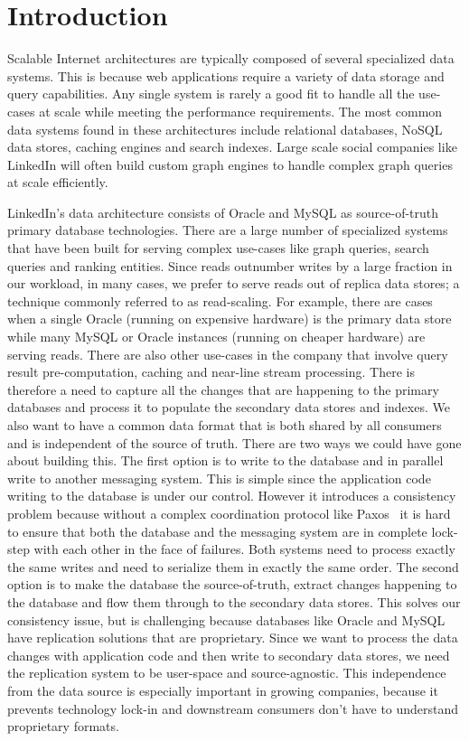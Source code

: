 \section{Introduction}

Scalable Internet architectures are typically composed of several specialized data systems. This is because web applications require a variety of data storage and query capabilities. Any single system is rarely a good fit to handle all the use-cases at scale while meeting the performance requirements. The most common data systems found in these architectures include relational databases, NoSQL data stores, caching engines and search indexes. Large scale social companies like LinkedIn will often build custom graph engines to handle complex graph queries at scale efficiently.

LinkedIn's data architecture consists of Oracle and MySQL as source-of-truth primary database technologies. There are a large number of specialized systems that have been built for serving complex use-cases like graph queries, search queries and ranking entities. Since reads outnumber writes by a large fraction in our workload, in many cases, we prefer to serve reads out of replica data stores; a technique commonly referred to as read-scaling. For example, there are cases when a single Oracle (running on expensive hardware) is the primary data store while many MySQL or Oracle instances (running on cheaper hardware) are serving reads. 
There are also other use-cases in the company that involve query result pre-computation, caching and near-line stream processing. 
There is therefore a need to capture all the changes that are happening to the primary databases and process it to populate the secondary data stores and indexes.
We also want to have a common data format that is both shared by all consumers and is independent of the source of truth. 
There are two ways we could have gone about building this. The first option is to write to the database and in parallel write to another messaging system. This is simple since the application code writing to the database is under our control. However it introduces a consistency problem because without a complex coordination protocol like Paxos~\cite{paxos} it is hard to ensure that both the database and the messaging system are in complete lock-step with each other in the face of failures. Both systems need to process exactly the same writes and need to serialize them in exactly the same order.
The second option is to make the database the source-of-truth, extract changes happening to the database and flow them through to the secondary data stores. This solves our consistency issue, but is challenging because databases like Oracle and MySQL have replication solutions that are proprietary. Since we want to process the data changes with application code and then write to secondary data stores, we need the replication system to be user-space and source-agnostic. This independence from the data source is especially important in growing companies, because it prevents technology lock-in and downstream consumers don't have to understand proprietary formats. 

